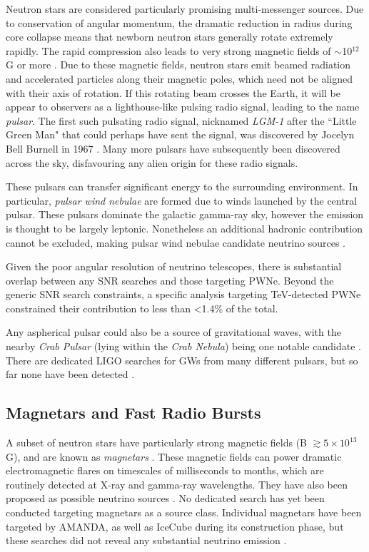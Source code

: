 Neutron stars are considered particularly promising multi-messenger sources. Due to conservation of angular momentum, the dramatic reduction in radius during core collapse means that newborn neutron stars generally rotate extremely rapidly. The rapid compression also leads to very strong magnetic fields of $\sim$10$^{12}$G or more \cite{carroll_06}. Due to these magnetic fields, neutron stars emit beamed radiation and accelerated particles along their magnetic poles, which need not be aligned with their axis of rotation. If this rotating beam crosses the Earth, it will be appear to observers as a lighthouse-like pulsing radio signal, leading to the name \emph{pulsar}. The first such pulsating radio signal, nicknamed \emph{LGM-1} after the ``Little Green Man" that could perhaps have sent the signal, was discovered by Jocelyn Bell Burnell in 1967 . Many more pulsars have subsequently been discovered across the sky, disfavouring any alien origin for these radio signals.

These pulsars can transfer significant energy to the surrounding environment. In particular, \emph{pulsar wind nebulae} are formed due to winds launched by the central pulsar. These pulsars dominate the galactic gamma-ray sky, however the emission is thought to be largely leptonic. Nonetheless an additional hadronic contribution cannot be excluded, making pulsar wind nebulae candidate neutrino sources .

Given the poor angular resolution of neutrino telescopes, there is substantial overlap between any SNR searches and those targeting PWNe. Beyond the generic SNR search constraints, a specific analysis targeting TeV-detected PWNe  constrained their contribution to less than <1.4\% of the total. 

Any aspherical pulsar could also be a source of gravitational waves, with the nearby \emph{Crab Pulsar} (lying within the \emph{Crab Nebula}) being one notable candidate . There are dedicated LIGO searches for GWs from many different pulsars, but so far none have been detected .

\subsection*{Magnetars and Fast Radio Bursts}
\label{sec:frb}

A subset of neutron stars have particularly strong magnetic fields (B $\gtrsim 5 \times 10^{13}$ G), and are known as \emph{magnetars} . These magnetic fields can power dramatic electromagnetic flares on timescales of milliseconds to months, which are routinely detected at X-ray and gamma-ray wavelengths. They have also been proposed as possible neutrino sources . No dedicated search has yet been conducted targeting magnetars as a source class. Individual magnetars have been targeted by AMANDA, as well as IceCube during its construction phase, but these searches did not reveal any substantial neutrino emission .

